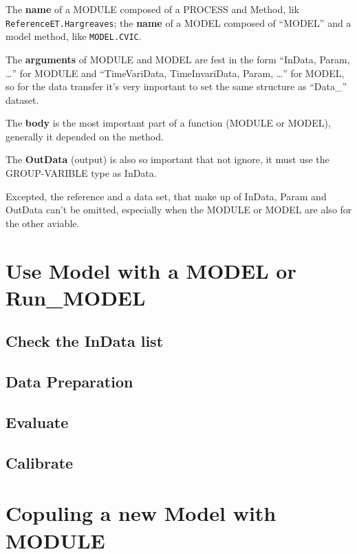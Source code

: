 \documentclass[
]{book}
\begin{document}
The \textbf{name} of a MODULE composed of a PROCESS and Method, lik \texttt{ReferenceET.Hargreaves}; the \textbf{name} of a MODEL composed of ``MODEL'' and a model method, like \texttt{MODEL.CVIC}.

The \textbf{arguments} of MODULE and MODEL are fest in the form ``InData, Param, \ldots{}'' for MODULE and ``TimeVariData, TimeInvariData, Param, \ldots{}'' for MODEL, so for the data transfer it's very important to set the same structure as ``Data\_'' dataset.

The \textbf{body} is the most important part of a function (MODULE or MODEL), generally it depended on the method.

The \textbf{OutData} (output) is also so important that not ignore, it must use the GROUP-VARIBLE type as InData.

Excepted, the reference and a data set, that make up of InData, Param and OutData can't be omitted, especially when the MODULE or MODEL are also for the other aviable.

\hypertarget{use-model-with-a-model-or-run_model}{%
\section{Use Model with a MODEL or Run\_MODEL}\label{use-model-with-a-model-or-run_model}}

\hypertarget{check-the-indata-list}{%
\subsection{Check the InData list}\label{check-the-indata-list}}

\hypertarget{data-preparation}{%
\subsection{Data Preparation}\label{data-preparation}}

\hypertarget{evaluate}{%
\subsection{Evaluate}\label{evaluate}}

\hypertarget{calibrate}{%
\subsection{Calibrate}\label{calibrate}}

\hypertarget{copuling-a-new-model-with-module}{%
\section{Copuling a new Model with MODULE}\label{copuling-a-new-model-with-module}}
\end{document}
